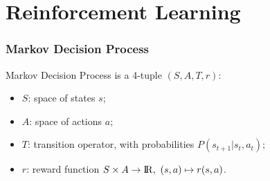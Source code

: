 \documentclass{beamer}
\begin{document}





    \section{Reinforcement Learning}

        \begin{frame}
            \frametitle{Markov Decision Process}
            Markov Decision Process is a 4-tuple $(S, A, T, r)$:
            \begin{itemize}
                \item $S$: space of states $s$;
                \item $A$: space of actions $a$;
                \item $T$: transition operator, with probabilities $P(s_{t+1} | s_t, a_t)$;
            \item $r$: reward function $S \times A \rightarrow {\rm I\!R}, \ (s, a) \mapsto r(s, a)$.
            \end{itemize}
        \end{frame}
\end{document}
